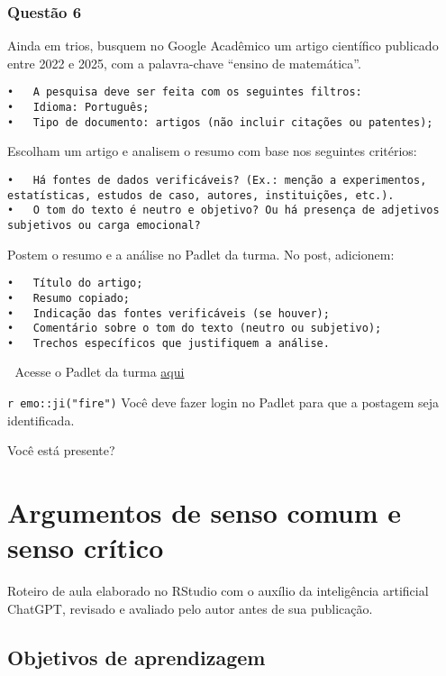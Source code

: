 \documentclass[
  letterpaper,
  DIV=11,
  numbers=noendperiod]{scrreprt}
\begin{document}
\subsection{Questão 6}\label{questuxe3o-6}

Ainda em trios, busquem no Google Acadêmico um artigo científico
publicado entre 2022 e 2025, com a palavra-chave ``ensino de
matemática''.

\begin{verbatim}
•   A pesquisa deve ser feita com os seguintes filtros:
•   Idioma: Português;
•   Tipo de documento: artigos (não incluir citações ou patentes);
\end{verbatim}

Escolham um artigo e analisem o resumo com base nos seguintes critérios:

\begin{verbatim}
•   Há fontes de dados verificáveis? (Ex.: menção a experimentos, estatísticas, estudos de caso, autores, instituições, etc.).
•   O tom do texto é neutro e objetivo? Ou há presença de adjetivos subjetivos ou carga emocional?
\end{verbatim}

Postem o resumo e a análise no Padlet da turma. No post, adicionem:

\begin{verbatim}
•   Título do artigo;
•   Resumo copiado;
•   Indicação das fontes verificáveis (se houver);
•   Comentário sobre o tom do texto (neutro ou subjetivo);
•   Trechos específicos que justifiquem a análise.
\end{verbatim}

🔗 Acesse o Padlet da turma
\href{https://padlet.com/mariomartins/anete-t01-b3r3eohs4gd7np8m}{aqui}

\texttt{r\ emo::ji("fire")} Você deve fazer login no Padlet para que a
postagem seja identificada.

Você está presente?

\chapter{Argumentos de senso comum e senso
crítico}\label{argumentos-de-senso-comum-e-senso-cruxedtico}

Roteiro de aula elaborado no RStudio com o auxílio da inteligência
artificial ChatGPT, revisado e avaliado pelo autor antes de sua
publicação.

\section{Objetivos de aprendizagem}\label{objetivos-de-aprendizagem-2}
\end{document}
